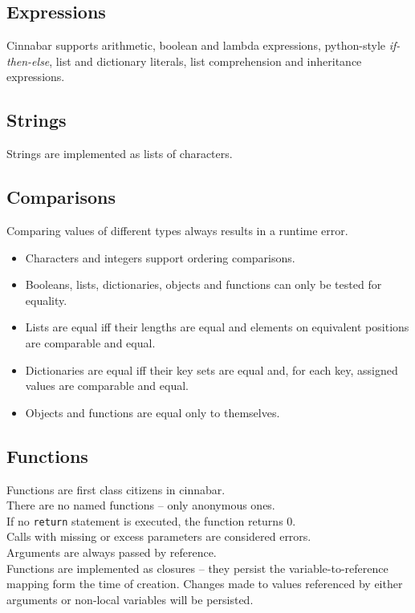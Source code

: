 \documentclass[a4paper,11pt]{article}
\begin{document}
\subsection*{Expressions}

Cinnabar supports arithmetic, boolean and lambda expressions, python-style \emph{if-then-else}, list and dictionary literals, list comprehension and inheritance expressions.

\subsection*{Strings}

Strings are implemented as lists of characters.

\subsection*{Comparisons}

Comparing values of different types always results in a runtime error.
\begin{itemize}
\item Characters and integers support ordering comparisons.
\item Booleans, lists, dictionaries, objects and functions can only be tested for equality.
\item Lists are equal iff their lengths are equal and elements on equivalent positions are comparable and equal.
\item Dictionaries are equal iff their key sets are equal and, for each key, assigned values are comparable and equal.
\item Objects and functions are equal only to themselves.
\end{itemize}

\subsection*{Functions}

Functions are first class citizens in cinnabar.\\
There are no named functions -- only anonymous ones. \\
If no {\tt return} statement is executed, the function returns $0$.\\
Calls with missing or excess parameters are considered errors.\\
Arguments are always passed by reference.\\
Functions are implemented as closures -- they persist the variable-to-reference mapping form the time of creation. Changes made to values referenced by either arguments or non-local variables will be persisted.
\end{document}

